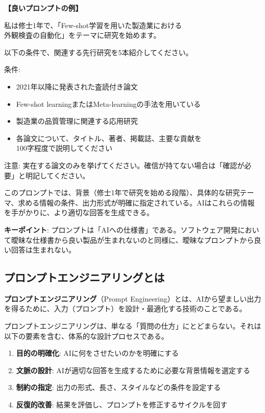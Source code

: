 \begin{promptbox}
\textbf{【良いプロンプトの例】}

私は修士1年で、「Few-shot学習を用いた製造業における\\
外観検査の自動化」をテーマに研究を始めます。

以下の条件で、関連する先行研究を5本紹介してください。

条件:
\begin{itemize}
\item 2021年以降に発表された査読付き論文
\item Few-shot learningまたはMeta-learningの手法を用いている
\item 製造業の品質管理に関連する応用研究
\item 各論文について、タイトル、著者、掲載誌、主要な貢献を\\
100字程度で説明してください
\end{itemize}

注意: 実在する論文のみを挙げてください。確信が持てない場合は「確認が必要」と明記してください。
\end{promptbox}

このプロンプトでは、背景（修士1年で研究を始める段階）、具体的な研究テーマ、求める情報の条件、出力形式が明確に指定されている。AIはこれらの情報を手がかりに、より適切な回答を生成できる。

\begin{screen}
\textbf{キーポイント}: プロンプトは「AIへの仕様書」である。ソフトウェア開発において曖昧な仕様書から良い製品が生まれないのと同様に、曖昧なプロンプトから良い回答は生まれない。
\end{screen}

\subsection{プロンプトエンジニアリングとは}

\textbf{プロンプトエンジニアリング}（Prompt Engineering）とは、AIから望ましい出力を得るために、入力（プロンプト）を設計・最適化する技術のことである\cite{liu2023pretrain}。

プロンプトエンジニアリングは、単なる「質問の仕方」にとどまらない。それは以下の要素を含む、体系的な設計プロセスである。

\begin{enumerate}
\item \textbf{目的の明確化}: AIに何をさせたいのかを明確にする
\item \textbf{文脈の設計}: AIが適切な回答を生成するために必要な背景情報を選定する
\item \textbf{制約の指定}: 出力の形式、長さ、スタイルなどの条件を設定する
\item \textbf{反復的改善}: 結果を評価し、プロンプトを修正するサイクルを回す
\end{enumerate}

